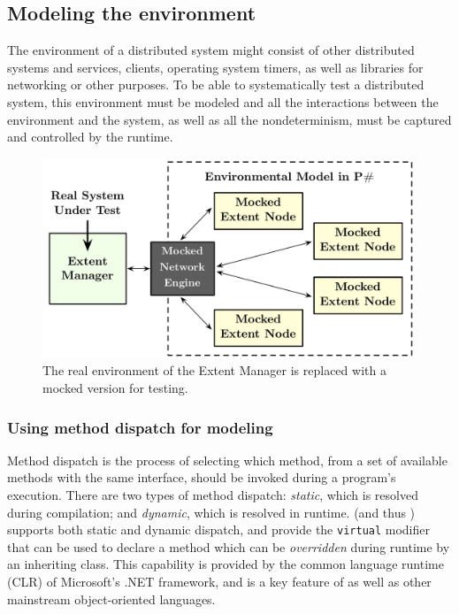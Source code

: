 \subsection{Modeling the environment}
\label{sec:method:model}

The environment of a distributed system might consist of other distributed systems and services, clients, operating system timers, as well as libraries for networking or other purposes. To be able to systematically test a distributed system, this environment must be modeled and all the interactions between the environment and the system, as well as all the nondeterminism, must be captured and controlled by the \psharp runtime.

\begin{figure}[t]
\centering
\includegraphics[width=\linewidth]{img/mocked_engine}
\caption{The real environment of the Extent Manager is replaced with a mocked version for testing.}
\label{fig:azurestoremodel}
\end{figure}

\subsubsection{Using method dispatch for modeling}
\label{sec:method:model:dd}

Method dispatch is the process of selecting which method, from a set of available methods with the same interface, should be invoked during a program's execution. There are two types of method dispatch: \emph{static}, which is resolved during compilation; and \emph{dynamic}, which is resolved in runtime.  \csharp (and thus \psharp) supports both static and dynamic dispatch, and provide the \texttt{virtual} modifier that can be used to declare a method which can be \emph{overridden} during runtime by an inheriting class. This capability is provided by the common language runtime (CLR) of Microsoft's .NET framework, and is a key feature of \csharp as well as other mainstream object-oriented languages.

